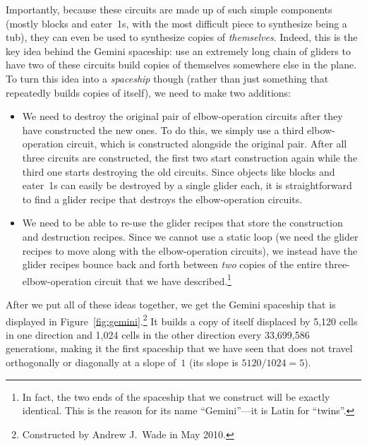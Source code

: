 Importantly, because these circuits are made up of such simple components (mostly blocks and eater~1s, with the most difficult piece to synthesize being a tub), they can even be used to synthesize copies of \emph{themselves}. Indeed, this is the key idea behind the Gemini spaceship: use an extremely long chain of gliders to have two of these circuits build copies of themselves somewhere else in the plane. To turn this idea into a \emph{spaceship} though (rather than just something that repeatedly builds copies of itself), we need to make two additions:\smallskip

\begin{itemize}
	\item[1)] We need to destroy the original pair of elbow-operation circuits after they have constructed the new ones. To do this, we simply use a third elbow-operation circuit, which is constructed alongside the original pair. After all three circuits are constructed, the first two start construction again while the third one starts destroying the old circuits. Since objects like blocks and eater~1s can easily be destroyed by a single glider each, it is straightforward to find a glider recipe that destroys the elbow-operation circuits.\smallskip
	
	\item[2)] We need to be able to re-use the glider recipes that store the construction and destruction recipes. Since we cannot use a static loop (we need the glider recipes to move along with the elbow-operation circuits), we instead have the glider recipes bounce back and forth between \emph{two} copies of the entire three-elbow-operation circuit that we have described.\footnote{In fact, the two ends of the spaceship that we construct will be exactly identical. This is the reason for its name ``Gemini''---it is Latin for ``twins''.}\smallskip
\end{itemize}

After we put all of these ideas together, we get the Gemini spaceship that is displayed in Figure~\ref{fig:gemini}.\footnote{Constructed by Andrew J.~Wade in May 2010.} It builds a copy of itself displaced by 5,120 cells in one direction and 1,024 cells in the other direction every 33,699,586 generations, making it the first spaceship that we have seen that does not travel orthogonally or diagonally at a slope of~$1$ (its slope is $5120/1024 = 5$).

